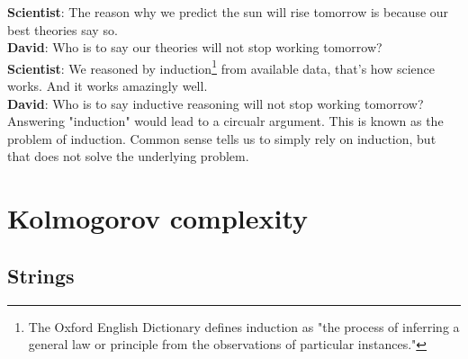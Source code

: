 {\setlength\parindent{0pt}
\textbf{Scientist}: The reason why we predict the sun will rise tomorrow is because our best theories say so.  \\

\textbf{David}: Who is to say our theories will not stop working tomorrow?  \\

\textbf{Scientist}: We reasoned by induction\footnote{The Oxford English Dictionary defines induction as "the process of inferring a general law or principle from the observations of particular instances."} from available data, that's how science works. And it works amazingly well.  \\

\textbf{David}: Who is to say inductive reasoning will not stop working tomorrow?  \\

Answering "induction" would lead to a circualr argument.
This is known as the problem of induction.
Common sense tells us to simply rely on induction, but that does not solve the underlying problem.
}

\newpage

\section{Kolmogorov complexity}

\subsection{Strings}

